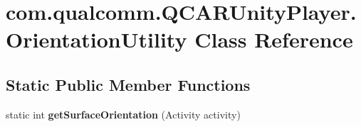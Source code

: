 \hypertarget{classcom_1_1qualcomm_1_1_q_c_a_r_unity_player_1_1_orientation_utility}{}\section{com.\+qualcomm.\+Q\+C\+A\+R\+Unity\+Player.\+Orientation\+Utility Class Reference}
\label{classcom_1_1qualcomm_1_1_q_c_a_r_unity_player_1_1_orientation_utility}
\subsection*{Static Public Member Functions}
\begin{DoxyCompactItemize}
\item 
\hypertarget{classcom_1_1qualcomm_1_1_q_c_a_r_unity_player_1_1_orientation_utility_a6cfac6b02f3cedf34e0655ca615abcc7}{}static int {\bfseries get\+Surface\+Orientation} (Activity activity)\label{classcom_1_1qualcomm_1_1_q_c_a_r_unity_player_1_1_orientation_utility_a6cfac6b02f3cedf34e0655ca615abcc7}

\end{DoxyCompactItemize}
